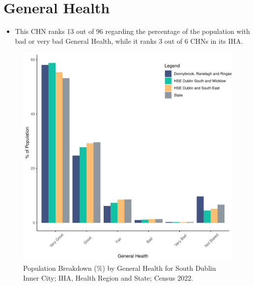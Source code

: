\documentclass{article}
\begin{document}
\pagebreak

\section{General Health}\label{sect:GenHealth}
\begin{itemize}
\item  This CHN ranks  13 out of 96 regarding the percentage of the population with bad or very bad General Health, while it ranks   3 out of 6 CHNs in its IHA.
\end{itemize}
\begin{figure}[h]
	\centering
	\includegraphics[width = 150mm]{../figures/GenED.pdf}
	\caption{Population Breakdown (\%) by General Health for South Dublin Inner City; IHA, Health Region and State;  Census 2022.}
	\label{fig:2ae19629-1a6a-13a3-e055-000000000001}
	\end{figure}
\end{document}
